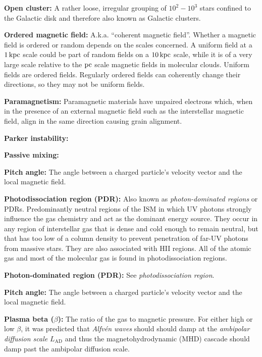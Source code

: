 \documentclass[a4paper,10pt]{article}
\begin{document}
{\noindent}\textbf{Open cluster:} A rather loose, irregular grouping of $10^2-10^3$ stars confined to the Galactic disk and therefore also known as Galactic clusters. 

{\noindent}\textbf{Ordered magnetic field:} A.k.a. ``coherent magnetic field''. Whether a magnetic field is ordered or random depends on the scales concerned. A uniform field at a $1\,{\rm kpc}$ scale could be part of random fields on a $10\,{\rm kpc}$ scale, while it is of a very large scale relative to the $\rm pc$ scale magnetic fields in molecular clouds. Uniform fields are ordered fields. Regularly ordered fields can coherently change their directions, so they may not be uniform fields. 

{\noindent}\textbf{Paramagnetism:} Paramagnetic materials have unpaired electrons which, when in the presence of an external magnetic field such as the interstellar magnetic field, align in the same direction causing grain alignment.

{\noindent}\textbf{Parker instability:}

{\noindent}\textbf{Passive mixing:}

{\noindent}\textbf{Pitch angle:} The angle between a charged particle's velocity vector and the local magnetic field.

{\noindent}\textbf{Photodissociation region (PDR):} Also known as \textit{photon-dominated regions} or PDRs. Predominantly neutral regions of the ISM in which UV photons strongly influence the gas chemistry and act as the dominant energy source. They occur in any region of interstellar gas that is dense and cold enough to remain neutral, but that has too low of a column density to prevent penetration of far-UV photons from massive stars. They are also associated with HII regions. All of the atomic gas and most of the molecular gas is found in photodissociation regions.

{\noindent}\textbf{Photon-dominated region (PDR):} See \textit{photodissociation region}.

{\noindent}\textbf{Pitch angle:} The angle between a charged particle's velocity vector and the local magnetic field.

{\noindent}\textbf{Plasma beta ($\beta$):} The ratio of the gas to magnetic pressure. For either high or low $\beta$, it was predicted that \textit{Alfv\'en waves} should should damp at the \textit{ambipolar diffusion scale} $L_\mathrm{AD}$ and thus the magnetohydrodynamic (MHD) cascade should damp past the ambipolar diffusion scale.
\end{document}
